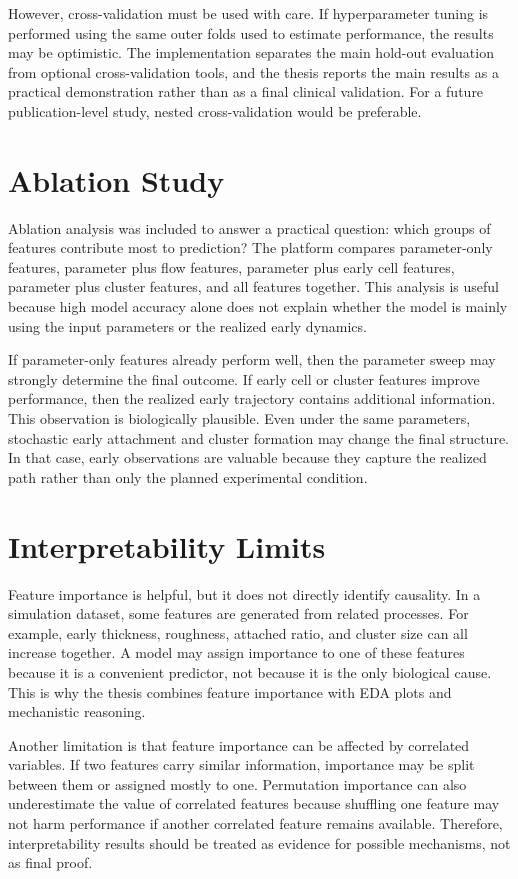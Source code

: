 \documentclass[12pt,a4paper,oneside]{report}
\begin{document}
However, cross-validation must be used with care. If hyperparameter tuning is performed using the same outer folds used to estimate performance, the results may be optimistic. The implementation separates the main hold-out evaluation from optional cross-validation tools, and the thesis reports the main results as a practical demonstration rather than as a final clinical validation. For a future publication-level study, nested cross-validation would be preferable.

\section{Ablation Study}
Ablation analysis was included to answer a practical question: which groups of features contribute most to prediction? The platform compares parameter-only features, parameter plus flow features, parameter plus early cell features, parameter plus cluster features, and all features together. This analysis is useful because high model accuracy alone does not explain whether the model is mainly using the input parameters or the realized early dynamics.

If parameter-only features already perform well, then the parameter sweep may strongly determine the final outcome. If early cell or cluster features improve performance, then the realized early trajectory contains additional information. This observation is biologically plausible. Even under the same parameters, stochastic early attachment and cluster formation may change the final structure. In that case, early observations are valuable because they capture the realized path rather than only the planned experimental condition.

\section{Interpretability Limits}
Feature importance is helpful, but it does not directly identify causality. In a simulation dataset, some features are generated from related processes. For example, early thickness, roughness, attached ratio, and cluster size can all increase together. A model may assign importance to one of these features because it is a convenient predictor, not because it is the only biological cause. This is why the thesis combines feature importance with EDA plots and mechanistic reasoning.

Another limitation is that feature importance can be affected by correlated variables. If two features carry similar information, importance may be split between them or assigned mostly to one. Permutation importance can also underestimate the value of correlated features because shuffling one feature may not harm performance if another correlated feature remains available. Therefore, interpretability results should be treated as evidence for possible mechanisms, not as final proof.
\end{document}
